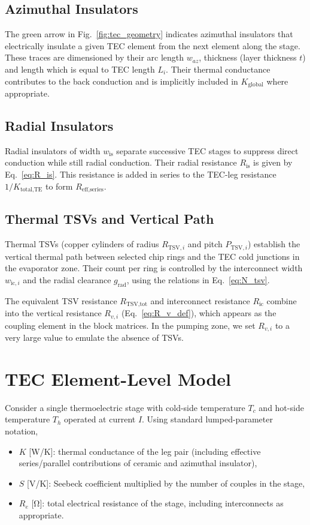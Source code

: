 \documentclass[conference]{IEEEtran}
\begin{document}
\subsection{Azimuthal Insulators}

The green arrow in Fig.~\ref{fig:tec_geometry} indicates azimuthal insulators that electrically insulate a given TEC element from the next element along the stage. These traces are dimensioned by their arc length $w_{az}$, thickness (layer thickness $t$) and length which is equal to TEC length $L_i$. Their thermal conductance contributes to the back conduction and is implicitly included in $K_{\text{global}}$ where appropriate.

\subsection{Radial Insulators}
\label{sec:radial_insulator}

Radial insulators of width $w_{\text{is}}$ separate successive TEC stages to suppress direct conduction while still radial conduction. Their radial resistance $R_{\text{is}}$ is given by Eq.~\eqref{eq:R_is}. This resistance is added in series to the TEC-leg resistance $1/K_{\text{total,TE}}$ to form $R_{\text{eff,series}}$.

\subsection{Thermal TSVs and Vertical Path}

Thermal TSVs (copper cylinders of radius $R_{\text{TSV},i}$ and pitch $P_{\text{TSV},i}$) establish the vertical thermal path between selected chip rings and the TEC cold junctions in the evaporator zone. Their count per ring is controlled by the interconnect width $w_{\text{ic},i}$ and the radial clearance $g_{\text{rad}}$, using the relations in Eq.~\eqref{eq:N_tsv}.

The equivalent TSV resistance $R_{\text{TSV,tot}}$ and interconnect resistance $R_{\text{ic}}$ combine into the vertical resistance $R_{v,i}$ (Eq.~\eqref{eq:R_v_def}), which appears as the coupling element in the block matrices. In the pumping zone, we set $R_{v,i}$ to a very large value to emulate the absence of TSVs.

\section{TEC Element-Level Model}

Consider a single thermoelectric stage with cold-side temperature $T_c$ and hot-side temperature $T_h$ operated at current $I$. Using standard lumped-parameter notation,
\begin{itemize}
	\item $K$ [W/K]: thermal conductance of the leg pair (including effective series/parallel contributions of ceramic and azimuthal insulator),
	\item $S$ [V/K]: Seebeck coefficient multiplied by the number of couples in the stage,
	\item $R_e$ [\si{\ohm}]: total electrical resistance of the stage, including interconnects as appropriate.
\end{itemize}
\end{document}
